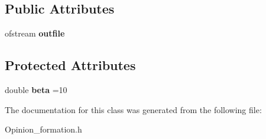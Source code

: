 \subsection*{Public Attributes}
\begin{DoxyCompactItemize}
\item 
\hypertarget{classOpinion__formation_a3050d046588c99ac730e4a00ffa4b631}{}ofstream {\bfseries outfile}\label{classOpinion__formation_a3050d046588c99ac730e4a00ffa4b631}

\end{DoxyCompactItemize}
\subsection*{Protected Attributes}
\begin{DoxyCompactItemize}
\item 
\hypertarget{classOpinion__formation_a4d8db8d1f1a9b635d88171788c9d1e38}{}double {\bfseries beta} =10\label{classOpinion__formation_a4d8db8d1f1a9b635d88171788c9d1e38}

\end{DoxyCompactItemize}


The documentation for this class was generated from the following file\+:\begin{DoxyCompactItemize}
\item 
Opinion\+\_\+formation.\+h\end{DoxyCompactItemize}
